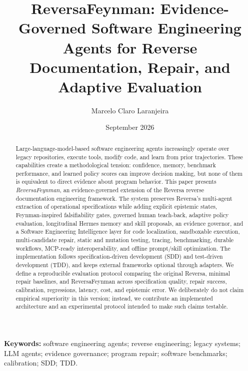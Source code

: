 \documentclass[11pt,a4paper]{article}
\title{\textbf{ReversaFeynman: Evidence-Governed Software Engineering Agents for Reverse Documentation, Repair, and Adaptive Evaluation}}
\author{Marcelo Claro Laranjeira}
\date{September 2026}
\begin{document}
\maketitle

\begin{abstract}
Large-language-model-based software engineering agents increasingly operate over legacy repositories, execute tools, modify code, and learn from prior trajectories. These capabilities create a methodological tension: confidence, memory, benchmark performance, and learned policy scores can improve decision making, but none of them is equivalent to direct evidence about program behavior. This paper presents \emph{ReversaFeynman}, an evidence-governed extension of the Reversa reverse documentation engineering framework. The system preserves Reversa's multi-agent extraction of operational specifications while adding explicit epistemic states, Feynman-inspired falsifiability gates, governed human teach-back, adaptive policy evaluation, longitudinal Hermes memory and skill proposals, an evidence governor, and a Software Engineering Intelligence layer for code localization, sandboxable execution, multi-candidate repair, static and mutation testing, tracing, benchmarking, durable workflows, MCP-ready interoperability, and offline prompt/skill optimization. The implementation follows specification-driven development (SDD) and test-driven development (TDD), and keeps external frameworks optional through adapters. We define a reproducible evaluation protocol comparing the original Reversa, minimal repair baselines, and ReversaFeynman across specification quality, repair success, calibration, regressions, latency, cost, and epistemic error. We deliberately do not claim empirical superiority in this version; instead, we contribute an implemented architecture and an experimental protocol intended to make such claims testable.
\end{abstract}

\noindent\textbf{Keywords:} software engineering agents; reverse engineering; legacy systems; LLM agents; evidence governance; program repair; software benchmarks; calibration; SDD; TDD.















\end{document}

